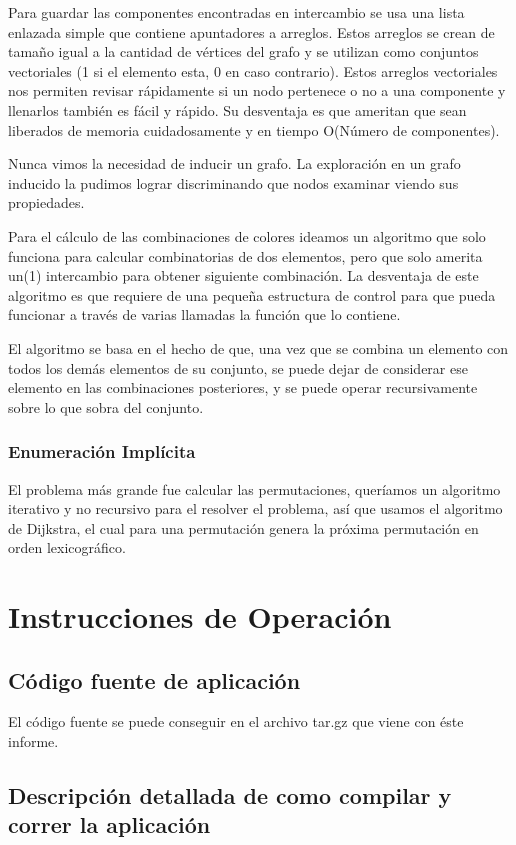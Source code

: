 \documentclass[a4paper,10pt]{article}
\begin{document}
Para guardar las componentes encontradas en intercambio se usa una lista enlazada simple que contiene apuntadores a arreglos. Estos arreglos se crean de tamaño igual a la cantidad de vértices del grafo y se utilizan como conjuntos vectoriales (1 si el elemento esta, 0 en caso contrario). Estos arreglos vectoriales nos permiten revisar rápidamente si un nodo pertenece o no a una componente y llenarlos también es fácil y rápido. Su desventaja es que ameritan que sean liberados de memoria cuidadosamente y en tiempo O(Número de componentes).

Nunca vimos la necesidad de inducir un grafo. La exploración en un grafo inducido la pudimos lograr discriminando que nodos examinar viendo sus propiedades.

Para el cálculo de las combinaciones de colores ideamos un algoritmo que solo funciona para calcular combinatorias de dos elementos, pero que solo amerita un(1) intercambio para obtener siguiente combinación. La desventaja de este algoritmo es que requiere de una pequeña estructura de control para que pueda funcionar a través de varias llamadas la función que lo contiene.

El algoritmo se basa en el hecho de que, una vez que se combina un elemento con todos los demás elementos de su conjunto, se puede dejar de considerar ese elemento en las combinaciones posteriores, y se puede operar recursivamente sobre lo que sobra del conjunto.

\subsubsection{Enumeración Implícita}
El problema más grande fue calcular las permutaciones, queríamos un algoritmo iterativo y no recursivo para el resolver el problema, así que usamos el algoritmo de Dijkstra, el cual para una permutación genera la próxima permutación en orden lexicográfico.
\newpage
\section{Instrucciones de Operación}

\subsection{Código fuente de aplicación}
El código fuente se puede conseguir en el archivo tar.gz que viene con éste informe.

\subsection{Descripción detallada de como compilar y correr la aplicación}
\end{document}
